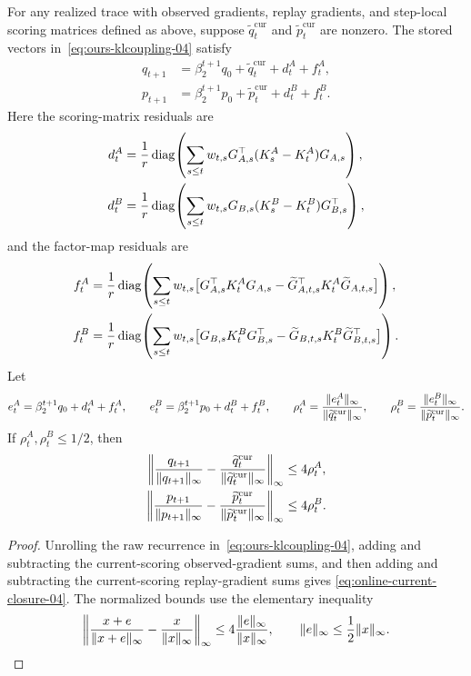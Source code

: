 \begin{lemma}\label{lem:online-decomp-04}
For any realized trace with observed gradients, replay gradients, and
step-local scoring matrices defined as above, suppose
$\widetilde q^{\mathrm{cur}}_t$ and $\widetilde p^{\mathrm{cur}}_t$ are nonzero.
The stored vectors in~\eqref{eq:ours-klcoupling-04} satisfy
\begin{equation}\label{eq:online-current-closure-04}
\begin{aligned}
  q_{t+1}
  &=
  \beta_2^{t+1}q_0+\widetilde q^{\mathrm{cur}}_t+d^A_t+f^A_t,
  \\
  p_{t+1}
  &=
  \beta_2^{t+1}p_0+\widetilde p^{\mathrm{cur}}_t+d^B_t+f^B_t .
\end{aligned}
\end{equation}
Here the scoring-matrix residuals are
\[
\begin{aligned}
  d^A_t
  &=
  \frac1r\operatorname{diag}\!\left(
    \sum_{s\le t}w_{t,s}
    G_{A,s}^\top(K^A_s-K^A_t)G_{A,s}
  \right),
  \\
  d^B_t
  &=
  \frac1r\operatorname{diag}\!\left(
    \sum_{s\le t}w_{t,s}
    G_{B,s}(K^B_s-K^B_t)G_{B,s}^\top
  \right),
\end{aligned}
\]
and the factor-map residuals are
\[
\begin{aligned}
  f^A_t
  &=
  \frac1r\operatorname{diag}\!\left(
    \sum_{s\le t}w_{t,s}
    \bigl[
      G_{A,s}^\top K^A_tG_{A,s}
      -
      \widetilde G_{A,t,s}^\top K^A_t\widetilde G_{A,t,s}
    \bigr]
  \right),
  \\
  f^B_t
  &=
  \frac1r\operatorname{diag}\!\left(
    \sum_{s\le t}w_{t,s}
    \bigl[
      G_{B,s}K^B_tG_{B,s}^\top
      -
      \widetilde G_{B,t,s}K^B_t\widetilde G_{B,t,s}^\top
    \bigr]
  \right).
\end{aligned}
\]
Let
\[
  e^A_t=\beta_2^{t+1}q_0+d^A_t+f^A_t,
  \qquad
  e^B_t=\beta_2^{t+1}p_0+d^B_t+f^B_t,
  \qquad
  \rho^A_t=\frac{\| e^A_t\|_\infty}{\| \widetilde q^{\mathrm{cur}}_t\|_\infty},
  \qquad
  \rho^B_t=\frac{\| e^B_t\|_\infty}{\| \widetilde p^{\mathrm{cur}}_t\|_\infty}.
\]
If $\rho^A_t,\rho^B_t\le1/2$, then
\[
\begin{aligned}
  \left\|
  \frac{q_{t+1}}{\| q_{t+1}\|_\infty}
  -
  \frac{\widetilde q^{\mathrm{cur}}_t}{\| \widetilde q^{\mathrm{cur}}_t\|_\infty}
  \right\|_\infty
  &\le 4\rho^A_t,
  \\
  \left\|
  \frac{p_{t+1}}{\| p_{t+1}\|_\infty}
  -
  \frac{\widetilde p^{\mathrm{cur}}_t}{\| \widetilde p^{\mathrm{cur}}_t\|_\infty}
  \right\|_\infty
  &\le 4\rho^B_t .
\end{aligned}
\]
\end{lemma}
\begin{proof}
Unrolling the raw recurrence in~\eqref{eq:ours-klcoupling-04}, adding and
subtracting the current-scoring observed-gradient sums, and then adding and
subtracting the current-scoring replay-gradient sums gives
\eqref{eq:online-current-closure-04}. The normalized bounds use the elementary
inequality
\[
  \left\|
  \frac{x+e}{\| x+e\|_\infty}
  -
  \frac{x}{\| x\|_\infty}
  \right\|_\infty
  \le
  4\frac{\| e\|_\infty}{\| x\|_\infty},
  \qquad
  \| e\|_\infty\le\frac12\| x\|_\infty .
\]
\end{proof}

